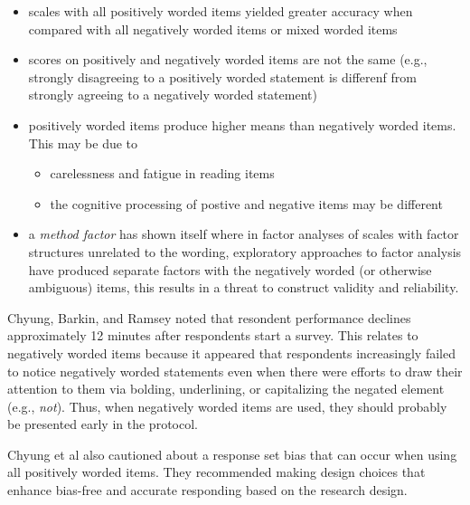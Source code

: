 \documentclass[
  english,
]{book}
\providecommand{\tightlist}{%
  \setlength{\itemsep}{0pt}\setlength{\parskip}{0pt}}
\begin{document}
\begin{itemize}
\tightlist
\item
  scales with all positively worded items yielded greater accuracy when compared with all negatively worded items or mixed worded items
\item
  scores on positively and negatively worded items are not the same (e.g., strongly disagreeing to a positively worded statement is differenf from strongly agreeing to a negatively worded statement)
\item
  positively worded items produce higher means than negatively worded items. This may be due to

  \begin{itemize}
  \tightlist
  \item
    carelessness and fatigue in reading items
  \item
    the cognitive processing of postive and negative items may be different
  \end{itemize}
\item
  a \emph{method factor} has shown itself where in factor analyses of scales with factor structures unrelated to the wording, exploratory approaches to factor analysis have produced separate factors with the negatively worded (or otherwise ambiguous) items, this results in a threat to construct validity and reliability.
\end{itemize}

Chyung, Barkin, and Ramsey \citeyearpar{chyung_evidencebased_2018} noted that resondent performance declines approximately 12 minutes after respondents start a survey. This relates to negatively worded items because it appeared that respondents increasingly failed to notice negatively worded statements even when there were efforts to draw their attention to them via bolding, underlining, or capitalizing the negated element (e.g., \emph{not}). Thus, when negatively worded items are used, they should probably be presented early in the protocol.

Chyung et al \citeyearpar{chyung_evidencebased_2018} also cautioned about a response set bias that can occur when using all positively worded items. They recommended making design choices that enhance bias-free and accurate responding based on the research design.
\end{document}
